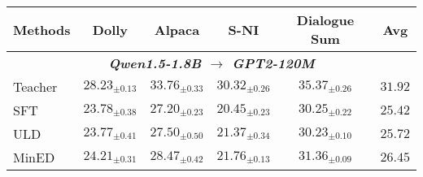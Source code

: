\begin{table*}[t]
\footnotesize
\centering
\begin{adjustbox}{width=\textwidth}
\begin{tabular}{l|c|c|c|c|c}
\toprule
\textbf{Methods} & \textbf{Dolly} & \textbf{Alpaca} & \textbf{S-NI} & \textbf{Dialogue Sum} & \textbf{Avg} \\ 
\bottomrule
\toprule
\multicolumn{6}{c}{\textit{\textbf{Qwen1.5-1.8B $\rightarrow$ GPT2-120M}}} \\ 
\hline
Teacher 
& $28.23_{\pm 0.13}$	
& $33.76_{\pm 0.33}$	
& $30.32_{\pm 0.26}$	
& $35.37_{\pm 0.26}$ 
& $31.92$ \\  
\cline{1-6}
SFT 
& $23.78_{\pm 0.38}$	
& $27.20_{\pm 0.23}$	
& $20.45_{\pm 0.23}$  
& $30.25_{\pm 0.22}$
& $25.42$ \\  
ULD \cite{boizard2024towards}
& $23.77_{\pm 0.41}$	
& $27.50_{\pm 0.50}$	
& $21.37_{\pm 0.34}$	
& $30.23_{\pm 0.10}$ 
& $25.72$ \\ 
MinED \cite{wan2024knowledge}
& $24.21_{\pm 0.31}$	
& $28.47_{\pm 0.42}$	
& $21.76_{\pm 0.13}$	 
& $31.36_{\pm 0.09}$ 
& $26.45$ \\ 

\end{tabular}
\end{adjustbox}
\end{table*}
